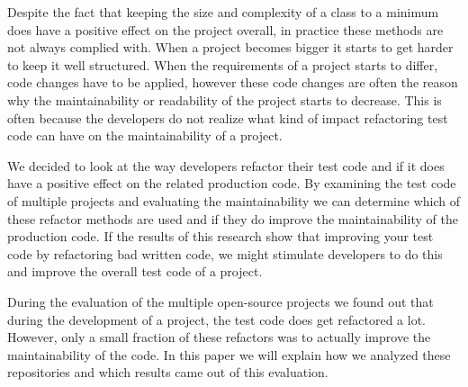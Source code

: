 Despite the fact that keeping the size and complexity of a class to a minimum
does have a positive effect on the project overall, in practice these methods
are not always complied with. When a project becomes bigger it starts to get
harder to keep it well structured. When the requirements of a project starts to
differ, code changes have to be applied, however these code changes are often
the reason why the maintainability or readability of the project starts to
decrease. This is often because the developers do not realize what kind of
impact refactoring test code can have on the maintainability of a project.

We decided to look at the way developers refactor their test code and if it does
have a positive effect on the related production code. By examining the test
code of multiple projects and evaluating the maintainability we can determine
which of these refactor methods are used and if they do improve the
maintainability of the production code. If the results of this research show
that improving your test code by refactoring bad written code, we might
stimulate developers to do this and improve the overall test code of a project.

During the evaluation of the multiple open-source projects we found out that
during the development of a project, the test code does get refactored a lot.
However, only a small fraction of these refactors was to actually improve the
maintainability of the code. In this paper we will explain how we analyzed these
repositories and which results came out of this evaluation.
